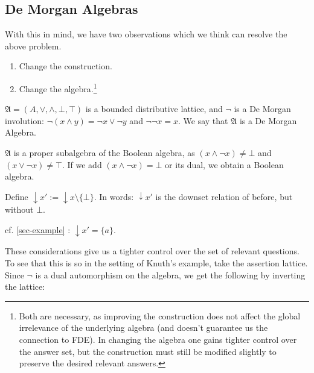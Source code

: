 \documentclass[11pt,a4paper]{article}
\theoremstyle{definition}
\begin{document}
\subsection{De Morgan Algebras}
With this in mind, we have two observations which we think can resolve the above problem. 
\begin{enumerate}
    \item Change the construction.
    \item Change the algebra.\footnote{Both are necessary, as improving the construction does not affect the global irrelevance of the underlying algebra (and doesn't guarantee us the connection to FDE). In changing the algebra one gains tighter control over the answer set, but the construction must still be modified slightly to preserve the desired relevant answers.}
\end{enumerate}

 $\mathfrak{A} = (A, \lor, \land, \bot, \top)$ is a bounded distributive lattice, and
$\neg$ is a De Morgan involution: $\neg(x \land y) = \neg 
x \lor \neg y$ and $\neg\neg x = x$. We say that $\mathfrak{A}$ is a De Morgan Algebra.

\note $\mathfrak{A}$ is a proper subalgebra of the Boolean algebra, as $(x \land \neg x) \neq \bot$ and $(x \lor \neg x) \neq \top$. If we add $(x \land \neg x) = \bot$ or its dual, we obtain a Boolean algebra. 

 Define $\downarrow x\prime := \downarrow x \setminus \{\bot\}$. In words: $\downarrow x\prime$ is the downset relation of before, but without $\bot$. 

\example cf. \ref{sec-example} : $\downarrow x\prime = \{a\}$.

\remark These considerations give us a tighter control over the set of relevant questions. To see that this is so in the setting of Knuth's example, take the assertion lattice. Since $\neg$ is a dual automorphism on the algebra, we get the following by inverting the lattice:

\end{document}
